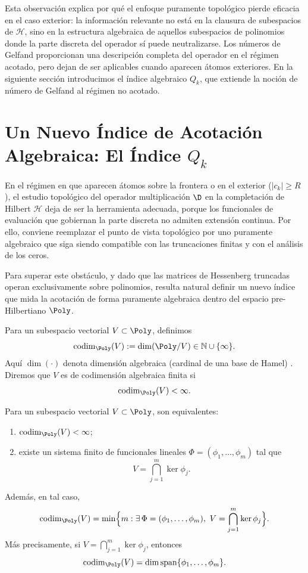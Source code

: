Esta observación explica por qué el enfoque puramente topológico pierde eficacia en el caso exterior: la información relevante no está en la clausura de subespacios de $\mathcal{H}$, sino en la estructura algebraica de aquellos subespacios de polinomios donde la parte discreta del operador sí puede neutralizarse. Los números de Gelfand proporcionan una descripción completa del operador en el régimen acotado, pero dejan de ser aplicables cuando aparecen átomos exteriores. En la siguiente sección introducimos el índice algebraico $Q_k$, que extiende la noción de número de Gelfand al régimen no acotado.

\section{Un Nuevo Índice de Acotación Algebraica: El Índice \texorpdfstring{$Q_k$}{Q_k}}

En el régimen en que aparecen átomos sobre la frontera o en el exterior ($|c_k|\ge R$), el estudio topológico del operador multiplicación $\D$ en la completación de Hilbert $\mathcal{H}$ deja de ser la herramienta adecuada, porque los funcionales de evaluación que gobiernan la parte discreta no admiten extensión continua. Por ello, conviene reemplazar el punto de vista topológico por uno puramente algebraico que siga siendo compatible con las truncaciones finitas y con el análisis de los ceros.

Para superar este obstáculo, y dado que las matrices de Hessenberg truncadas operan exclusivamente sobre polinomios, resulta natural definir un nuevo índice que mida la acotación de forma puramente algebraica dentro del espacio pre-Hilbertiano $\Poly$.

\begin{defn}\label{def:codim_alg}
	Para un subespacio vectorial $V\subset \Poly$, definimos
	\[
		\operatorname{codim}_{\Poly}(V):=\dim(\Poly/V)\in \mathbb N\cup\{\infty\}.
	\]
	Aquí $\dim(\cdot)$ denota dimensión algebraica (cardinal de una base de Hamel) \cite{hormander1989linearfunctionalanalysis,Aizpuru2009Apuntes}.
	Diremos que $V$ es de codimensión algebraica finita si
	\[
		\operatorname{codim}_{\Poly}(V)<\infty.
	\]
\end{defn}

\begin{prop}\label{prop:finite-codim-kernels}
	Para un subespacio vectorial $V\subset \Poly$, son equivalentes:
	\begin{enumerate}
		\item $\operatorname{codim}_{\Poly}(V)<\infty$;
		\item existe un sistema finito de funcionales lineales $\Phi=(\phi_1,\dots,\phi_m)$
		      tal que
		      \[
			      V=\bigcap_{j=1}^m \ker \phi_j.
		      \]
	\end{enumerate}
	Además, en tal caso,
	\[
		\operatorname{codim}_{\Poly}(V)
		=
		\min\Bigl\{m:\exists\,\Phi=(\phi_1,\dots,\phi_m),\
		V=\bigcap_{j=1}^m\ker\phi_j\Bigr\}.
	\]
	Más precisamente, si $V=\bigcap_{j=1}^m\ker\phi_j$, entonces
	\[
		\operatorname{codim}_{\Poly}(V)=\dim\operatorname{span}\{\phi_1,\dots,\phi_m\}.
	\]
\end{prop}

